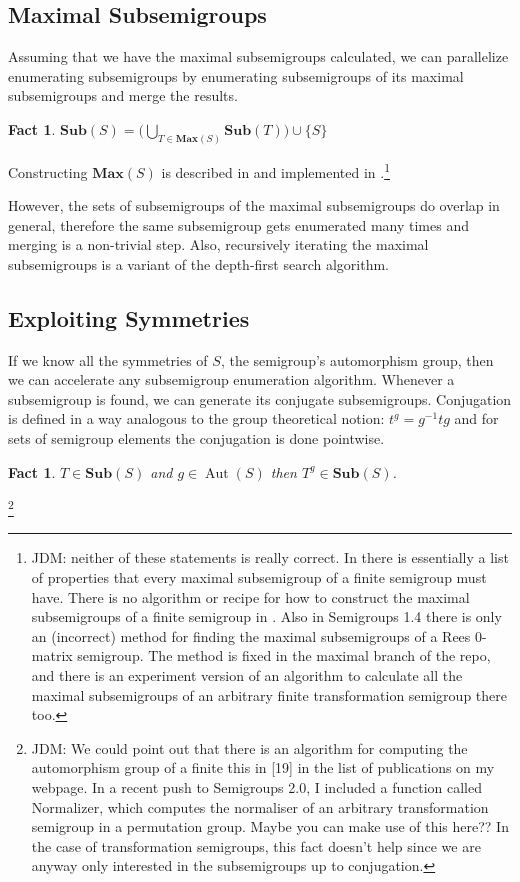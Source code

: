\documentclass{amsart}
\newcommand{\Sub}{\mathbf{Sub}}
\newcommand{\Max}{\mathbf{Max}}
\DeclareMathOperator{\Aut}{Aut}
\theoremstyle{plain}
\newtheorem{fact}[theorem]{Fact}
\theoremstyle{definition}
\begin{document}
\subsection{Maximal Subsemigroups}
Assuming that we have the maximal subsemigroups calculated, we can parallelize enumerating subsemigroups by enumerating subsemigroups of its maximal subsemigroups and merge the results.
\begin{fact}
$\Sub(S)=\big( \bigcup_{T\in \Max(S)}\Sub(T)\big)\cup \{S\}$
\end{fact}
\noindent Constructing $\Max(S)$ is described in \cite{MaxSubSemi} and
implemented in \cite{Semigroups}.\footnote{JDM: neither of these statements is
  really correct. In \cite{MaxSubSemi} there is essentially a list of properties
  that every maximal subsemigroup of a finite semigroup must have. There is no
  algorithm or recipe for how to construct the maximal subsemigroups of a finite
  semigroup in \cite{MaxSubSemi}. Also in Semigroups 1.4 there is only an
  (incorrect) method for finding the maximal subsemigroups of a Rees 0-matrix
  semigroup. The method is fixed in the maximal branch of the repo, and there is
  an experiment version of an algorithm to calculate all the maximal
subsemigroups of an arbitrary finite transformation semigroup there too.}

However, the sets of subsemigroups of the maximal subsemigroups do overlap in general, therefore the same subsemigroup gets enumerated many times and merging is a non-trivial step.
Also, recursively iterating the maximal subsemigroups is a variant of the depth-first search algorithm.  

\subsection{Exploiting Symmetries}
If we know all the symmetries of $S$, the semigroup's automorphism group, then we can accelerate any subsemigroup enumeration algorithm.
Whenever a subsemigroup is found, we can generate its conjugate subsemigroups.
Conjugation is defined in a way analogous to the group theoretical notion: $t^g=g^{-1}tg$ and for sets of semigroup elements the conjugation is done pointwise.
 
\begin{fact}
$T\in\Sub(S)$ and $g\in \Aut(S)$ then $T^g\in\Sub(S)$.%
\end{fact}
\footnote{JDM: We could point out that there is an algorithm for computing the
  automorphism group of a finite this in [19] in the list of publications on my
webpage. In a recent push to Semigroups 2.0, I included a function called
Normalizer, which computes the normaliser of an arbitrary transformation
semigroup in a permutation group. Maybe you can make use of this here??
In the case of transformation semigroups, this fact doesn't help since we are
anyway only interested in the subsemigroups up to conjugation.}
\end{document}
